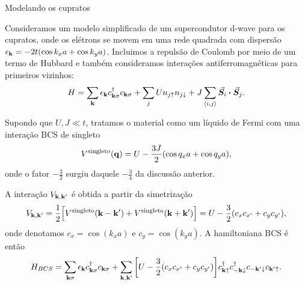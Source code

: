 \documentclass[8pt,aspectratio=169,xcolor={table,dvipsnames,usenames}]{beamer}
\begin{document}

\begin{frame}{Modelando os cupratos}

Consideramos um modelo simplificado de um supercondutor d-wave para os cupratos, onde os elétrons se movem em uma rede quadrada com dispersão $\epsilon_{\vb{k}} = -2t (\cos k_x a + \cos k_y a)$. Incluimos a repulsão de Coulomb por meio de um termo de Hubbard e também consideramos interações antiferromagnéticas para primeiros vizinhos:
$$
H = \sum_{\k} \eps_{\k} c_{\k\s}^\d c_{\k\s} + \sum_{j} U n_{j\up} n_{j\down} + J \sum_{\nn{i}{j}} \va*{S}_i \vdot \va*{S}_j.
$$

Supondo que $U, J \ll t$, tratamos o material como um líquido de Fermi com uma interação BCS de singleto
$$
V^{\text{singleto}}(\vb{q}) = U - \frac{3J}{2} (\cos q_x a + \cos q_y a),
$$
onde o fator $-\frac{3}{2}$ surgiu daquele $-\frac{3}{4}$ da discussão anterior.

A interação $V_{\vb{k},\vb{k}'}$ é obtida a partir da simetrização
$$
V_{\vb{k},\vb{k}'} = \frac{1}{2}
\Big[
V^{\text{singleto}}(\vb{k}-\vb{k}') + V^{\text{singleto}}(\vb{k}+\vb{k}')
\Big] =
U - \frac{3}{2} (c_x c_{x'} + c_y c_{y'}),
$$
onde denotamos $c_x = \cos(k_x a)$ e $c_y = \cos(k_y a)$. A hamiltoniana BCS é então
$$
H_{BCS} = \sum_{\vb{k}\sigma} \epsilon_{\vb{k}} c_{\vb{k}\sigma}^\dagger c_{\vb{k}\sigma} +
\sum_{\vb{k},\vb{k}'} \qty[U - \frac{3}{2} (c_x c_{x'} + c_y c_{y'})]
c_{\vb{k}\uparrow}^\dagger c_{-\vb{k}\downarrow}^\dagger c_{-\vb{k}'\downarrow} c_{\vb{k}'\uparrow}.
$$

\end{frame}

\end{document}
